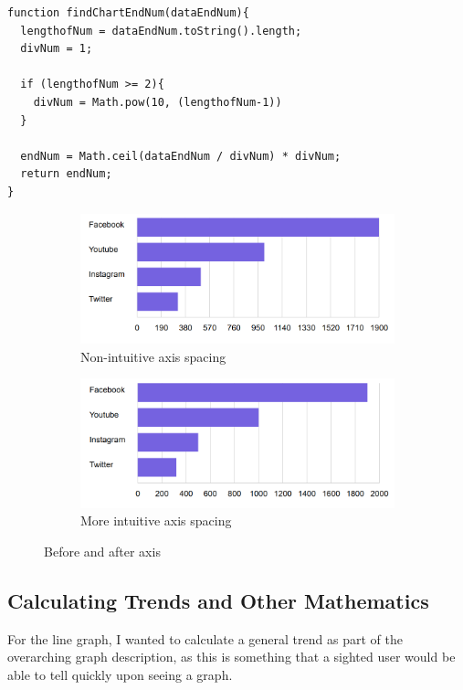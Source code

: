 \documentclass[ %
                    author={Aleena Baig},
                supervisor={Dr Simon Lock},
                    degree={BSc},
                     title={On Making Web Accessible Graphs},
                  subtitle={},
                      year={2019} ]{dissertation}
\begin{document}
\begin{lstlisting}
function findChartEndNum(dataEndNum){
  lengthofNum = dataEndNum.toString().length;
  divNum = 1;

  if (lengthofNum >= 2){
    divNum = Math.pow(10, (lengthofNum-1))
  }

  endNum = Math.ceil(dataEndNum / divNum) * divNum;
  return endNum;
}
\end{lstlisting}

\begin{figure}[h]
  \centering
  \begin{subfigure}[b]{0.4\linewidth}
    \includegraphics[width=\linewidth]{images/awkwardAxis.PNG}
     \caption{Non-intuitive axis spacing}
  \end{subfigure}
  \begin{subfigure}[b]{0.4\linewidth}
    \includegraphics[width=\linewidth]{images/lessAwkwardAxis.PNG}
    \caption{More intuitive axis spacing}
  \end{subfigure}
  \caption{Before and after axis}
  \label{fig:Awkwardsaxis}
\end{figure}

\subsection{Calculating Trends and Other Mathematics}

For the line graph, I wanted to calculate a general trend as part of the overarching graph description, as this is something that a sighted user would be able to tell quickly upon seeing a graph.
\end{document}
